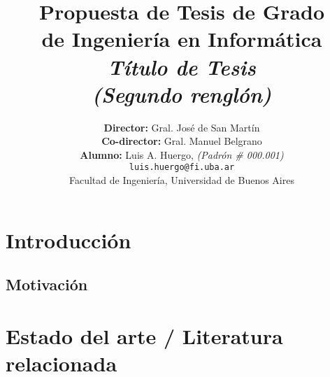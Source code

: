 \documentclass[12pt]{article}
\begin{document}
\begin{titlepage}

    \title{     \textbf{Propuesta de Tesis de Grado \\ de Ingeniería en Informática}\\[2.5ex]
        \textit{Título de Tesis \\(Segundo renglón)} }

    \author{
        \textbf{Director:} Gral. José de San Martín \\[2.5ex]
        \textbf{Co-director:} Gral. Manuel Belgrano \\[2.5ex]
        \textbf{Alumno:} Luis A. Huergo, \textit{(Padrón \# 000.001)}                                \\
        \texttt{ luis.huergo@fi.uba.ar }                                    \\[2.5ex]
        \normalsize{Facultad de Ingeniería, Universidad de Buenos Aires}        \\
    }
    \date{}

\end{titlepage}

\maketitle
\thispagestyle{empty}

\maketitle

{
    \hypersetup{linkcolor=black}
    \tableofcontents
}


\section{Introducción}

\subsection{Motivación}

\bigskip


\section{Estado del arte / Literatura relacionada}
\end{document}
